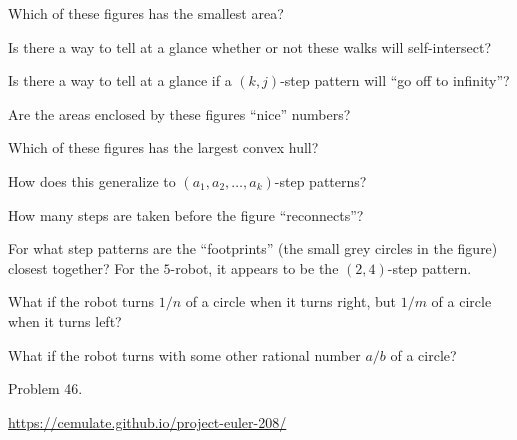 \documentclass{article}
\begin{document}
\begin{related}
  \item Which of these figures has the smallest area?
  \item Is there a way to tell at a glance whether or not these walks will
    self-intersect?
  \item Is there a way to tell at a glance if a $(k,j)$-step pattern will
    ``go off to infinity''?
  \item Are the areas enclosed by these figures ``nice'' numbers?
  \item Which of these figures has the largest convex hull?
  \item How does this generalize to $(a_1, a_2, \hdots, a_k)$-step patterns?
  \item How many steps are taken before the figure ``reconnects''?
  \item For what step patterns are the ``footprints''
    (the small grey circles in the figure) closest together?
    For the $5$-robot, it appears to be the $(2, 4)$-step pattern.
  \item What if the robot turns $1/n$ of a circle when it turns right, but
    $1/m$ of a circle when it turns left?
  \item What if the robot turns with some other rational number $a/b$ of a
    circle?
\end{related}
\begin{references}
  \item Problem 46.
  \item \url{https://cemulate.github.io/project-euler-208/}
\end{references}
\end{document}
